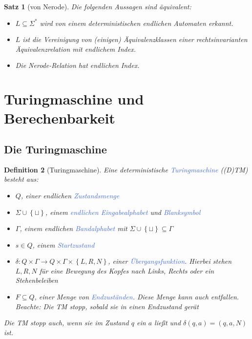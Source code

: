 \documentclass[11pt]{article}
\newcommand{\tcol}[1]{\textcolor{RoyalBlue}{#1}}
\newcommand{\set}[1]{\left\lbrace #1\right\rbrace}
\theoremstyle{break}
\newtheorem{satz}{Satz}[section]
\newtheorem{defi}[satz]{Definition}
\begin{document}
\begin{satz}[von Nerode]
Die folgenden Aussagen sind äquivalent:
\begin{itemize}
\item $L\subseteq\Sigma^*$ wird von einem deterministischen endlichen Automaten erkannt.
\item $L$ ist die Vereinigung von (einigen) Äquivalenzklassen einer rechtsinvarianten Äquivalenzrelation mit endlichem Index.
\item Die Nerode-Relation hat endlichen Index.
\end{itemize}
\end{satz}



\section{Turingmaschine und Berechenbarkeit}


\subsection{Die Turingmaschine}

\begin{defi}[Turingmaschine]
Eine deterministische \tcol{Turingmaschine} ((D)TM) besteht aus:
\begin{itemize}
\item $Q$, einer endlichen \tcol{Zustandsmenge}
\item $\Sigma\cup\set{\sqcup}$, einem \tcol{endlichen Eingabealphabet} und \tcol{Blanksymbol}
\item $\Gamma$, einem endlichen \tcol{Bandalphabet} mit $\Sigma\cup\set{\sqcup}\subseteq\Gamma$
\item $s\in Q$, einem \tcol{Startzustand}
\item $\delta\colon Q\times\Gamma\to Q\times \Gamma\times\set{L,R,N}$, einer \tcol{Übergangsfunktion}. Hierbei stehen $L,R,N$ für eine Bewegung des Kopfes nach Links, Rechts oder ein Stehenbeleiben
\item $F\subseteq Q$, einer Menge von \tcol{Endzuständen}. Diese Menge kann auch entfallen.\\
Beachte: Die TM stopp, sobald sie in einen Endzustand gerät
\end{itemize}
Die TM stopp auch, wenn sie im Zustand $q$ ein $a$ ließt und $\delta(q,a)=(q,a,N)$ ist.
\end{defi}
\end{document}

